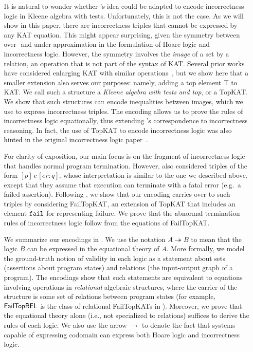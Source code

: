 It is natural to wonder whether \citeauthor{Kozen_2000}'s idea could be
adapted to encode incorrectness logic in Kleene algebra with tests.
Unfortunately, this is not the case. As we will show in this paper, there are
incorrectness triples that cannot be expressed by any KAT equation.  This might
appear surprising, given the symmetry between over- and under-approximation in
the formulation of Hoare logic and incorrectness logic.  However, the symmetry
involves the \emph{image} of a set by a relation, an operation that is not part
of the syntax of KAT\@.  Several prior works have considered enlarging KAT with
similar
operations~\cite{Desharnais_Möller_Struth_2004,Fahrenberg_Johansen_Struth_Ziemiánski_2021,Desharnais_Möller_Struth_2006},
but we show here that a smaller extension also serves our purposes: namely,
adding a top element \(\top\) to KAT\@.   We call such a structure a \emph{Kleene
  algebra with tests and top}, or a TopKAT\@.  We show that such structures can
encode inequalities between images, which we use to express incorrectness
triples.  The encoding allows us to prove the rules of incorrectness logic
equationally, thus extending \citeauthor{Kozen_2000}'s correspondence to
incorrectness reasoning. In fact, the use of TopKAT to encode incorrectness logic was also hinted in the original incorrectness logic paper~\cite{OHearn_2020}.

For clarity of exposition, our main focus is on the fragment of incorrectness
logic that handles normal program termination.  However,
\citet{OHearn_2020} also considered triples of the form
\([p]\, c\, [er: q]\), whose interpretation is similar to the one we described
above, except that they assume that execution can terminate with a fatal error
(e.g.\ a failed assertion).  Following \citet{Mamouras_2017}, we show
that our encoding carries over to such triples by considering FailTopKAT, an
extension of TopKAT that includes an element \(\mathtt{fail}\) for representing failure.
We prove that the abnormal termination rules of incorrectness logic follow from
the equations of FailTopKAT\@.

We summarize our encodings in .  We
use the notation \(A ↠ B\) to mean that the logic \(B\) can be
expressed in the equational theory of \(A\).  More formally, we model the
ground-truth notion of validity in each logic as a statement about sets
(assertions about program states) and relations (the input-output graph of a
program).  The encodings show that such statements are equivalent to equations
involving operations in \emph{relational} algebraic structures, where the
carrier of the structure is some set of relations between program states (for
example, \(\mathsf{FailTopREL}\) is the class of relational FailTopKATs in
).  Moreover, we prove that the equational
theory alone (i.e., not specialized to relations) suffices to derive the rules
of each logic.  We also use the arrow \(\to\) to denote the fact that 
systems capable of expressing codomain can express both Hoare logic and incorrectness logic.


